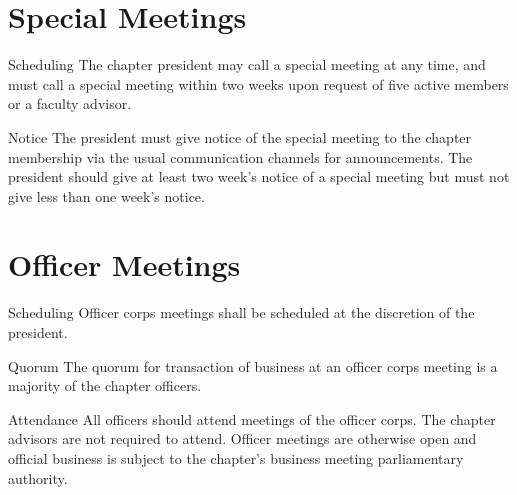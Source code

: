 \section{Special Meetings}
\begin{enumsubsection}
\item{Scheduling} The chapter president may call a special meeting at any time, and must call a special meeting within two weeks upon request of five active members or a faculty advisor.
\item{Notice} The president must give notice of the special meeting to the chapter membership via the usual communication channels for announcements. The president should give at least two week's notice of a special meeting but must not give less than one week's notice.
\end{enumsubsection}

\section{Officer Meetings}
\begin{enumsubsection}
\item{Scheduling} Officer corps meetings shall be scheduled at the discretion of the president. 
\item{Quorum} The quorum for transaction of business at an officer corps meeting is a majority of the chapter officers.
\item{Attendance} All officers should attend meetings of the officer corps. The chapter advisors are not required to attend. Officer meetings are otherwise open and official business is subject to the chapter's business meeting parliamentary authority.
\end{enumsubsection}
